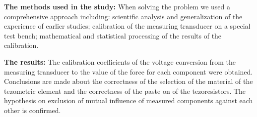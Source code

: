 \textbf{The methods used in the study:} When solving the problem we used a comprehensive approach including: scientific analysis and generalization of the experience of earlier studies; calibration of the measuring transducer on a special test bench; mathematical and statistical processing of the results of the calibration.

\textbf{The results:} The calibration coefficients of the voltage conversion from the measuring transducer to the value of the force for each component were obtained. Conclusions are made about the correctness of the selection of the material of the tezometric element and the correctness of the paste on of the tezoresistors. The hypothesis on exclusion of mutual influence of measured components against each other is confirmed.